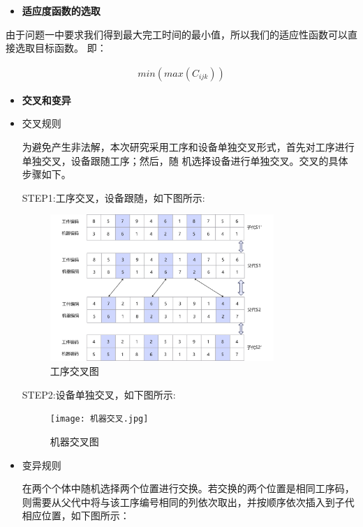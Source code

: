\documentclass{whutmod}
\begin{document}
\begin{spacing}{1.2}
\begin{itemize}
	    \item[\textbf{2.}] \textbf{适应度函数的选取}
	\end{itemize}

 由于问题一中要求我们得到最大完工时间的最小值，所以我们的适应性函数可以直接选取目标函数。
 即：

 \begin{gather}
		min\left ( max\left ( C_{ijk}  \right )  \right ) 
	\end{gather}

 \begin{itemize}
	    \item[\textbf{3.}] \textbf{交叉和变异}
	\end{itemize}
 
 \begin{itemize}
	    \item 交叉规则
     
为避免产生非法解，本次研究采用工序和设备单独交叉形式，首先对工序进行单独交叉，设备跟随工序；然后，随 机选择设备进行单独交叉。交叉的具体步骤如下。 

  STEP1:工序交叉，设备跟随，如下图所示:

  \begin{figure}[H]
		\centering
		\includegraphics[width=0.8\textwidth]{工序交叉.jpg}
		\caption{工序交叉图}
	\end{figure}


  STEP2:设备单独交叉，如下图所示:

  \begin{figure}[H]
		\centering
		\texttt{[image: 机器交叉.jpg]}
		\caption{机器交叉图}
	\end{figure}


        \item 变异规则

        在两个个体中随机选择两个位置进行交换。若交换的两个位置是相同工序码，则需要从父代中将与该工序编号相同的列依次取出，并按顺序依次插入到子代相应位置，如下图所示：



\end{itemize}
\end{spacing}
\end{document}
